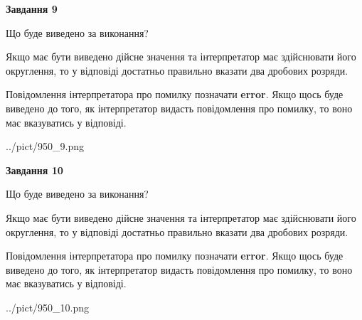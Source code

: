 \documentclass[12pt, ukrainian]{article}
\begin{document}
{\begin {Large}
{\begin {center}\textbf{Завдання 9}\end {center}}\par
Що буде виведено за виконання? \par

Якщо має бути виведено дійсне значення та інтерпретатор має здійснювати його округлення, 
то у відповіді достатньо правильно вказати два дробових розряди.

Повідомлення інтерпретатора про помилку позначати \textbf{error}.
Якщо щось буде виведено до того, як інтерпретатор видасть повідомлення про помилку, 
то воно має вказуватись у відповіді. \par

\begin{center}
	{../pict/950_9.png}
\end{center}
\newpage

{\begin {center}\textbf{Завдання 10}\end {center}}\par
Що буде виведено за виконання? \par

Якщо має бути виведено дійсне значення та інтерпретатор має здійснювати його округлення, 
то у відповіді достатньо правильно вказати два дробових розряди.

Повідомлення інтерпретатора про помилку позначати \textbf{error}.
Якщо щось буде виведено до того, як інтерпретатор видасть повідомлення про помилку, 
то воно має вказуватись у відповіді. \par

\begin{center}
	{../pict/950_10.png}
\end{center}
\newpage

\end {Large}}
\end{document}
